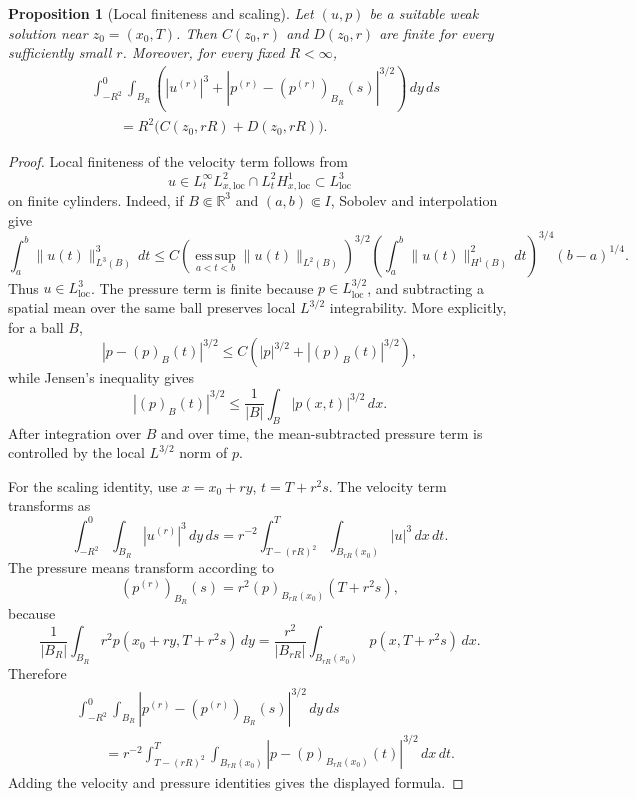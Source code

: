 \documentclass[11pt]{amsart}
\theoremstyle{plain}
\newtheorem{proposition}[proposition]{Proposition}
\theoremstyle{definition}
\theoremstyle{remark}
\begin{document}
\begin{proposition}[Local finiteness and scaling]\label{prop:critical-scaling}
Let \((u,p)\) be a suitable weak solution near \(z_0=(x_0,T)\).  Then
\(C(z_0,r)\) and \(D(z_0,r)\) are finite for every sufficiently small \(r\).
Moreover, for every fixed \(R<\infty\),
\[
\begin{aligned}
&\int_{-R^2}^{0}\int_{B_R}
\left(
|u^{(r)}|^3+
|p^{(r)}-(p^{(r)})_{B_R}(s)|^{3/2}
\right)\,dy\,ds \\
&\qquad
=R^2\bigl(C(z_0,rR)+D(z_0,rR)\bigr).
\end{aligned}
\]
\end{proposition}

\begin{proof}
Local finiteness of the velocity term follows from
\[
  u\in L^\infty_tL^2_{x,\mathrm{loc}}
  \cap L^2_tH^1_{x,\mathrm{loc}}
  \subset L^3_{\mathrm{loc}}
\]
on finite cylinders.  Indeed, if \(B\Subset\mathbb R^3\) and
\((a,b)\Subset I\), Sobolev and interpolation give
\[
  \int_a^b \|u(t)\|_{L^3(B)}^3\,dt
  \le
  C
  \left(\operatorname*{ess\,sup}_{a<t<b}\|u(t)\|_{L^2(B)}\right)^{3/2}
  \left(\int_a^b \|u(t)\|_{H^1(B)}^2\,dt\right)^{3/4}
  (b-a)^{1/4}.
\]
Thus \(u\in L^3_{\mathrm{loc}}\).  The pressure term is finite because
\(p\in L^{3/2}_{\mathrm{loc}}\), and subtracting a spatial mean over the same
ball preserves local \(L^{3/2}\) integrability.  More explicitly, for a ball
\(B\),
\[
  |p-(p)_B(t)|^{3/2}\le C\left(|p|^{3/2}+|(p)_B(t)|^{3/2}\right),
\]
while Jensen's inequality gives
\[
  |(p)_B(t)|^{3/2}
  \le \frac1{|B|}\int_B |p(x,t)|^{3/2}\,dx.
\]
After integration over \(B\) and over time, the mean-subtracted pressure term is
controlled by the local \(L^{3/2}\) norm of \(p\).

For the scaling identity, use \(x=x_0+ry\), \(t=T+r^2s\).  The velocity term
transforms as
\[
  \int_{-R^2}^{0}\int_{B_R}|u^{(r)}|^3\,dy\,ds
  =r^{-2}\int_{T-(rR)^2}^{T}\int_{B_{rR}(x_0)}|u|^3\,dx\,dt.
\]
The pressure means transform according to
\[
  (p^{(r)})_{B_R}(s)=r^2(p)_{B_{rR}(x_0)}(T+r^2s),
\]
because
\[
  \frac1{|B_R|}\int_{B_R} r^2p(x_0+ry,T+r^2s)\,dy
  =
  \frac{r^2}{|B_{rR}|}\int_{B_{rR}(x_0)}p(x,T+r^2s)\,dx .
\]
Therefore
\[
\begin{aligned}
&\int_{-R^2}^{0}\int_{B_R}
|p^{(r)}-(p^{(r)})_{B_R}(s)|^{3/2}\,dy\,ds \\
&\qquad =
r^{-2}\int_{T-(rR)^2}^{T}\int_{B_{rR}(x_0)}
|p-(p)_{B_{rR}(x_0)}(t)|^{3/2}\,dx\,dt .
\end{aligned}
\]
Adding the velocity and pressure identities gives the displayed formula.
\end{proof}
\end{document}

